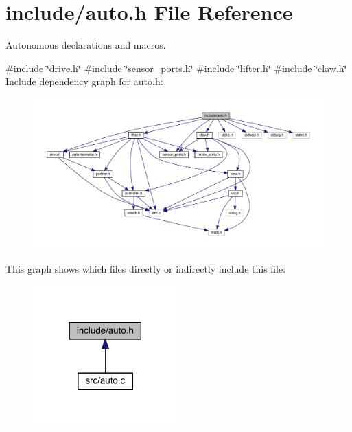 \section{include/auto.h File Reference}
\label{auto_8h}


Autonomous declarations and macros.  


{\ttfamily \#include \char`\"{}drive.\+h\char`\"{}}\newline
{\ttfamily \#include \char`\"{}sensor\+\_\+ports.\+h\char`\"{}}\newline
{\ttfamily \#include \char`\"{}lifter.\+h\char`\"{}}\newline
{\ttfamily \#include \char`\"{}claw.\+h\char`\"{}}\newline
Include dependency graph for auto.\+h\+:\nopagebreak
\begin{figure}[H]
\begin{center}
\leavevmode
\includegraphics[width=350pt]{auto_8h__incl}
\end{center}
\end{figure}
This graph shows which files directly or indirectly include this file\+:\nopagebreak
\begin{figure}[H]
\begin{center}
\leavevmode
\includegraphics[width=158pt]{auto_8h__dep__incl}
\end{center}
\end{figure}
